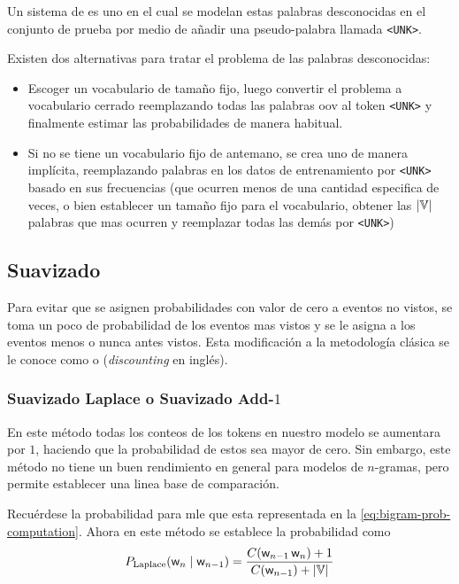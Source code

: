 Un sistema de  es uno en el cual se modelan estas palabras desconocidas en el conjunto de prueba por medio de añadir una pseudo-palabra llamada \texttt{<UNK>}.

Existen dos alternativas para tratar el problema de las palabras desconocidas:
\begin{itemize}
\item Escoger un vocabulario de tamaño fijo, luego convertir el problema a vocabulario cerrado reemplazando todas las palabras \gls{oov} al token \texttt{<UNK>} y finalmente estimar las probabilidades de manera habitual.
  
\item Si no se tiene un vocabulario fijo de antemano, se crea uno de manera implícita, reemplazando palabras en los datos de entrenamiento por \texttt{<UNK>} basado en sus frecuencias (que ocurren menos de una cantidad especifica de veces, o bien establecer un tamaño fijo para el vocabulario, obtener las $|{\mathbb{V}}|$ palabras que mas ocurren y reemplazar todas las demás por \texttt{<UNK>})
\end{itemize}


\subsection{Suavizado}
Para evitar que se asignen probabilidades con valor de cero a eventos no vistos, se toma un poco de probabilidad de los eventos mas vistos y se le asigna a los eventos menos o nunca antes vistos. Esta modificación a la metodología clásica se le conoce como  o  (\textsl{discounting} en inglés).

\subsubsection{Suavizado Laplace o Suavizado Add-$1$}
En este método todas los conteos de los tokens en nuestro modelo se aumentara por $1$, haciendo que la probabilidad de estos sea mayor de cero. Sin embargo, este método no tiene un buen rendimiento en general para modelos de $n$-gramas, pero permite establecer una linea base de comparación.

Recuérdese la probabilidad para \gls{mle} que esta representada en la \cref{eq:bigram-prob-computation}. Ahora en este método se establece la probabilidad como
\begin{equation} \label{eq:laplace-smoothing}
  P_{\mathrm{Laplace}}({\mathit{\mathsf{w}}}_n \mid {\mathit{\mathsf{w}}}_{n-1}) = \frac{C({\mathit{\mathsf{w}}}_{n-1} \, {\mathit{\mathsf{w}}}_n) +1}{C({\mathit{\mathsf{w}}}_{n-1}) + |{\mathbb{V}}|}
\end{equation}

